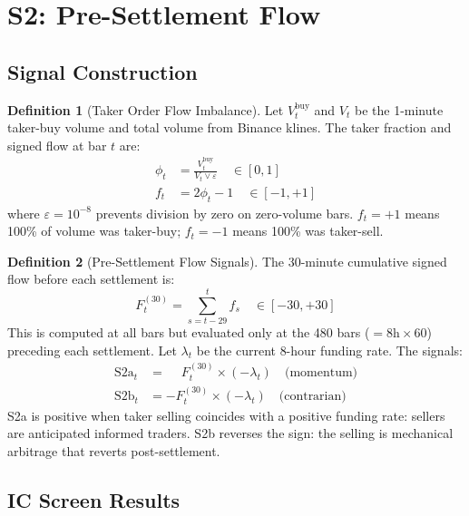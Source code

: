 \documentclass[12pt, a4paper]{article}
\theoremstyle{plain}
\theoremstyle{definition}
\newtheorem{definition}{Definition}[section]
\begin{document}
\section{S2: Pre-Settlement Flow}
\label{sec:s2}

\subsection{Signal Construction}

\begin{definition}[Taker Order Flow Imbalance]
  Let $V^{\mathrm{buy}}_t$ and $V_t$ be the 1-minute taker-buy volume
  and total volume from Binance klines.  The taker fraction and signed
  flow at bar $t$ are:
  \begin{align}
    \phi_t &= \frac{V^{\mathrm{buy}}_t}{V_t \vee \varepsilon}
    \quad\in [0,1] \\
    f_t &= 2\phi_t - 1 \quad\in [-1, +1]
  \end{align}
  where $\varepsilon = 10^{-8}$ prevents division by zero on zero-volume bars.
  $f_t = +1$ means 100\% of volume was taker-buy; $f_t = -1$ means 100\%
  was taker-sell.
\end{definition}

\begin{definition}[Pre-Settlement Flow Signals]
  The 30-minute cumulative signed flow before each settlement is:
  \begin{equation}
    F^{(30)}_t = \sum_{s=t-29}^{t} f_s
    \quad\in [-30, +30]
  \end{equation}
  This is computed at all bars but evaluated only at the 480 bars
  ($= 8\text{h} \times 60$) preceding each settlement.
  Let $\lambda_t$ be the current 8-hour funding rate.  The signals:
  \begin{align}
    \text{S2a}_t &= \phantom{-}F^{(30)}_t \times (-\lambda_t)
      \quad\text{(momentum)} \\
    \text{S2b}_t &= -F^{(30)}_t \times (-\lambda_t)
      \quad\text{(contrarian)}
  \end{align}
  S2a is positive when taker selling coincides with a positive funding
  rate: sellers are anticipated informed traders.  S2b reverses the
  sign: the selling is mechanical arbitrage that reverts post-settlement.
\end{definition}

\subsection{IC Screen Results}
\end{document}
